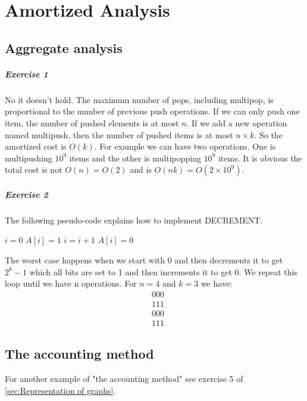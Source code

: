 \documentclass{book}
\begin{document}
	\chapter{Amortized Analysis}
	\section{Aggregate analysis}
	\paragraph{Exercise 1}
	No it doesn't hold. The maximum number of pops, including multipop, is proportional to the number of previous push operations. If we can only push one item, the number of pushed elements is at most $n$. If we add a new operation named multipush, then the number of pushed items is at most $n \times k$. So the amortized cost is $O(k)$. For example we can have two operations. One is multipushing $10^9$ items and the other is multipopping $10^9$ items. It is obvious the total cost is not $O(n) = O(2)$ and is $O(nk) = O(2 \times 10^9)$.
	\paragraph{Exercise 2}
	The following pseudo-code explains how to implement DECREMENT.
	\begin{algorithm*}[h!]
		\begin{algorithmic}[1]
			\State $i = 0$
			\State $A[i] = 1$
			\State $i = i + 1$
			\EndWhile
			\State $A[i] = 0$
			\EndIf
			\EndFunction
		\end{algorithmic}
	\end{algorithm*}
	The worst case happens when we start with 0 and then decrements it to get $2^k - 1$ which all bits are set to 1 and then increments it to get 0. We repeat this loop until we have n operations. For $n = 4$ and $k = 3$ we have:
	\begin{align*}
		&000 \\
		&111 \\
		&000 \\
		&111
	\end{align*}
	\section{The accounting method}
	For another example of "the accounting method" see exercise 5 of \ref{sec:Representation of graphs}.
\end{document}
